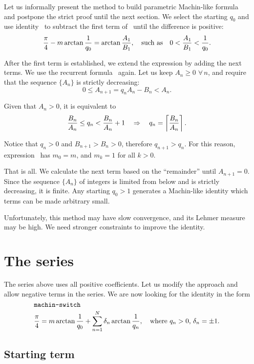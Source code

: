 \documentclass[draft, 11pt]{article} %
\begin{document}
Let us informally present the method to build parametric Machin-like formula and postpone
the strict proof until the next section.
We select the starting $q_0$ and use identity~ to subtract
the first term of~ until the difference is positive:
$$
\dfrac{\pi}{4} - m \arctan\dfrac{1}{q_0} = \arctan\dfrac{A_1}{B_1}, \quad\hbox{such as}\quad
0 < \dfrac{A_1}{B_1} < \dfrac{1}{q_0}.
$$

After the first term is established,
we extend the expression by adding the next terms.
We use the recurrent formula~ again.
Let us keep $A_n \ge 0$ $\forall \, n$,
and require that the sequence $\{ A_n \}$ is strictly decreasing:
$$
0 \le A_{n+1} = q_n A_n - B_n < A_n.
$$

Given that $A_n > 0$, it is equivalent to
$$
\dfrac{B_n}{A_n} \le q_n < \dfrac{B_n}{A_n} + 1 \quad\ergo\quad 
q_n = \nceil{\dfrac{B_n}{A_n}}.
$$

Notice that $q_n > 0$ and $B_{n+1} > B_n > 0$, therefore $q_{n+1} > q_n$.
For this reason, expression~ has $m_0 = m$, and $m_k = 1$ for all $k>0$.

That is all. We calculate the next term based on the ``remainder'' until $A_{n+1} = 0$.
Since the sequence $\{ A_n \}$ of integers is limited from below and is strictly decreasing, it is finite.
Any starting $q_0 > 1$ generates a Machin-like identity which terms
can be made arbitrary small.

Unfortunately, this method may have slow convergence, and its Lehmer measure may be high.
We need stronger constraints to improve the identity.
 
\section{The series}

The series above uses all positive coefficients. Let us modify the approach and allow
negative terms in the series. We are now looking for the identity in the form
%
\begin{equation}\mlabel{machin-switch}
\dfrac{\pi}{4} = m \arctan \dfrac{1}{q_0} +
    \sum_{n=1}^N \delta_n \arctan \dfrac{1}{q_n},
    \quad\hbox{where $q_n > 0$, $\delta_n=\pm 1$.}
\end{equation}

\subsection{Starting term}
\end{document}
